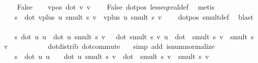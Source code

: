 \begin{isabellebody}
\isamarkupfalse%
\isanewline
\ \ \isamarkupfalse%
\ False\isanewline
\ \ \isamarkupfalse%
\ vpos{\isacharcolon}{\kern0pt}\ {\isachardoublequoteopen}dot\ v\ v\ {\isachargreater}{\kern0pt}\ {}{\isachardoublequoteclose}\ \isamarkupfalse%
\ False\ dot{\isacharunderscore}{\kern0pt}pos\ less{\isacharunderscore}{\kern0pt}eq{\isacharunderscore}{\kern0pt}real{\isacharunderscore}{\kern0pt}def\ \isamarkupfalse%
\ metis\isanewline
\ \ \isamarkupfalse%
\ {}{\isacharcolon}{\kern0pt}\ {\isachardoublequoteopen}{\isasymforall}\ s\ {\isachardot}{\kern0pt}\ dot\ {\isacharparenleft}{\kern0pt}vplus\ u\ {\isacharparenleft}{\kern0pt}smult\ s\ v{\isacharparenright}{\kern0pt}{\isacharparenright}{\kern0pt}\ \ {\isacharparenleft}{\kern0pt}vplus\ u\ {\isacharparenleft}{\kern0pt}smult\ s\ v{\isacharparenright}{\kern0pt}{\isacharparenright}{\kern0pt}\ {\isasymge}\ {}{\isachardoublequoteclose}\ \isamarkupfalse%
\ dot{\isacharunderscore}{\kern0pt}pos\ smult{\isacharunderscore}{\kern0pt}def\ \isamarkupfalse%
\ blast\isanewline
\ \ \isamarkupfalse%
\ {}{\isacharcolon}{\kern0pt}\ {\isachardoublequoteopen}{\isasymforall}\ s\ {\isachardot}{\kern0pt}dot\ u\ u\ {\isacharplus}{\kern0pt}\ dot\ u\ {\isacharparenleft}{\kern0pt}smult\ s\ v{\isacharparenright}{\kern0pt}\ \ {\isacharplus}{\kern0pt}\ dot\ {\isacharparenleft}{\kern0pt}smult\ s\ v{\isacharparenright}{\kern0pt}\ u\ {\isacharplus}{\kern0pt}\ dot\ \ {\isacharparenleft}{\kern0pt}smult\ s\ v{\isacharparenright}{\kern0pt}\ \ {\isacharparenleft}{\kern0pt}smult\ s\ v{\isacharparenright}{\kern0pt}\ {\isasymge}\ {}{\isachardoublequoteclose}\ \ \isanewline
\ \ \ \ \isamarkupfalse%
\ {}\ dot{\isacharunderscore}{\kern0pt}distrib\ dot{\isacharunderscore}{\kern0pt}commute\ \ \isamarkupfalse%
\ {\isacharparenleft}{\kern0pt}simp\ add{\isacharcolon}{\kern0pt}\ is{\isacharunderscore}{\kern0pt}num{\isacharunderscore}{\kern0pt}normalize{\isacharparenleft}{\kern0pt}{}{\isacharparenright}{\kern0pt}{\isacharparenright}{\kern0pt}\isanewline
\ \ \isamarkupfalse%
\ {}{\isacharcolon}{\kern0pt}\ {\isachardoublequoteopen}{\isasymforall}\ s\ {\isachardot}{\kern0pt}\ dot\ u\ u\ {\isacharplus}{\kern0pt}\ {}\ {\isacharasterisk}{\kern0pt}\ {\isacharparenleft}{\kern0pt}dot\ u\ {\isacharparenleft}{\kern0pt}smult\ s\ v{\isacharparenright}{\kern0pt}{\isacharparenright}{\kern0pt}\ {\isacharplus}{\kern0pt}\ dot\ \ {\isacharparenleft}{\kern0pt}smult\ s\ v{\isacharparenright}{\kern0pt}\ \ {\isacharparenleft}{\kern0pt}smult\ s\ v{\isacharparenright}{\kern0pt}\ {\isasymge}\ {}{\isachardoublequoteclose}\ \isanewline

\end{isabellebody}

